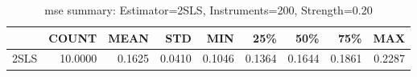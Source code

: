 \begin{table}[ht]
\centering
\caption{mse summary: Estimator=2SLS, Instruments=200, Strength=0.20}
\begin{tabular}{lrrrrrrrr}
\toprule
 & COUNT & MEAN & STD & MIN & 25\% & 50\% & 75\% & MAX \\
\midrule
2SLS & 10.0000 & 0.1625 & 0.0410 & 0.1046 & 0.1364 & 0.1644 & 0.1861 & 0.2287 \\
\bottomrule
\end{tabular}
\end{table}
